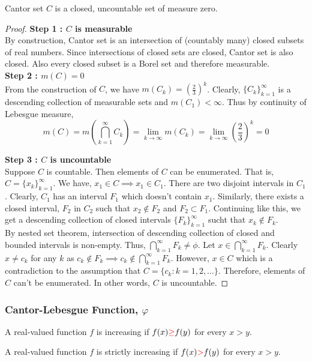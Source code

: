 \begin{theorem}
	Cantor set $C$ is a closed, uncountable set of measure zero.
\end{theorem}
\begin{proof}
	\textbf{Step 1 : $C$ is measurable}\\
	By construction, Cantor set is an intersection of (countably	many) closed subsets of real numbers.
	Since intersections of closed sets are closed, Cantor set is also closed.
	Also every closed subset is a Borel set and therefore measurable.\\

	\textbf{Step 2 : $m(C) = 0$}\\
	From the construction of $C$,
	we have $m(C_k) = \left( \frac{2}{3} \right)^k$.
	Clearly, $\{ C_k \}_{k=1}^\infty$ is a descending collection of measurable sets and $m(C_1) < \infty$.
	Thus by continuity of Lebesgue measure, 
	$$\displaystyle m(C) = m \left( \bigcap_{k=1}^\infty C_k \right) =  \lim_{k \to \infty} m(C_k) = \lim_{k \to \infty} \left( \frac{2}{3} \right)^k = 0$$

	\textbf{Step 3 : $C$ is uncountable}\\
	Suppose $C$ is countable.
	Then elements of $C$ can be enumerated.
	That is, $C = \{ x_k \}_{k=1}^\infty$.
	We have, $x_1  \in C \implies x_1 \in C_1$.
	There are two disjoint intervals in $C_1$.
	Clearly, $C_1$ has an interval $F_1$ which doesn't contain $x_1$.
	Similarly, there exists a closed interval, $F_2$ in  $C_2$ such that $x_2 \notin F_2$ and $F_2 \subset F_1$.
	Continuing like this, we get a descending collection of closed intervals $\{ F_k \}_{k=1}^\infty$ sucht that $x_k \notin F_k$.\\

	By nested set theorem, intersection of descending collection of closed and bounded intervals is non-empty.
	Thus, $\displaystyle \bigcap_{k=1}^\infty F_k \ne \phi$.
	Let $x \in \displaystyle \bigcap_{k=1}^\infty F_k$.
	Clearly $x \ne c_k$ for any $k$ as $\displaystyle c_k \notin F_k \implies c_k \notin \bigcap_{k=1}^\infty F_k$.
	However, $x \in C$ which is a contradiction to the assumption that $C = \{ c_k : k = 1,2,\dots \}$.
	Therefore, elements of $C$ can't be enumerated.
	In other words, $C$ is uncountable.
\end{proof}

\subsubsection{Cantor-Lebesgue Function, $\varphi$}
\begin{definition}[increasing]
	A real-valued function $f$ is increasing if $f(x) {\color{red}\ge} f(y)$ for every $x > y$.
\end{definition}
\begin{definition}
	A real-valued function $f$ is strictly increasing if $f(x) {\color{red}>} f(y)$ for every $x > y$.
\end{definition}

